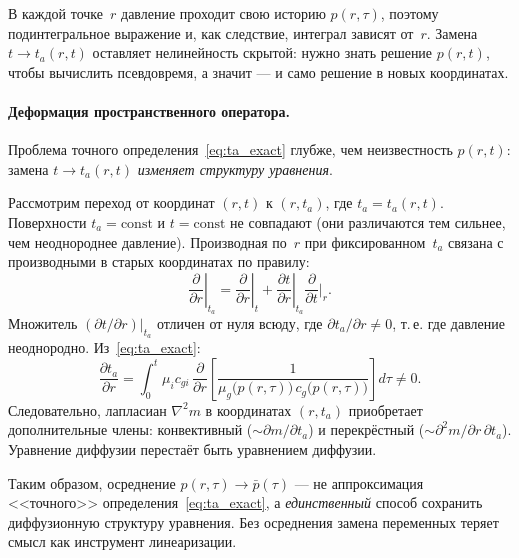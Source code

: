 ﻿\documentclass[12pt,a4paper]{article}
\begin{document}
В каждой точке~$r$ давление проходит свою историю $p(r,\tau)$,
поэтому подинтегральное выражение и, как следствие, интеграл
зависят от~$r$. Замена $t \to t_a(r,t)$ оставляет нелинейность
скрытой: нужно знать решение $p(r,t)$, чтобы вычислить
псевдовремя, а значит --- и само решение в новых координатах.

\paragraph{Деформация пространственного оператора.}
Проблема точного определения~\eqref{eq:ta_exact} глубже, чем
неизвестность $p(r,t)$: замена $t \to t_a(r,t)$ \emph{изменяет
структуру уравнения}.

Рассмотрим переход от координат $(r,t)$ к $(r,t_a)$, где
$t_a = t_a(r,t)$. Поверхности $t_a = \mathrm{const}$ и
$t = \mathrm{const}$ не совпадают (они различаются тем
сильнее, чем неоднороднее давление). Производная по~$r$
при фиксированном~$t_a$ связана с производными в старых
координатах по правилу:
\begin{equation}\label{eq:dr_ta}
  \left.\frac{\partial}{\partial r}\right|_{t_a}
  = \left.\frac{\partial}{\partial r}\right|_{t}
  + \left.\frac{\partial t}{\partial r}\right|_{t_a}
    \frac{\partial}{\partial t}\bigg|_{r}.
\end{equation}
Множитель $(\partial t/\partial r)|_{t_a}$ отличен от нуля
всюду, где $\partial t_a/\partial r \neq 0$, т.\,е. где
давление неоднородно. Из~\eqref{eq:ta_exact}:
\begin{equation}\label{eq:dta_dr}
  \frac{\partial t_a}{\partial r}
  = \int_0^t \mu_i c_{gi}\,
    \frac{\partial}{\partial r}
    \!\left[\frac{1}{\mu_g\bigl(p(r,\tau)\bigr)\,
    c_g\bigl(p(r,\tau)\bigr)}\right] d\tau
  \neq 0.
\end{equation}
Следовательно, лапласиан $\nabla^2 m$ в координатах $(r,t_a)$
приобретает дополнительные члены: конвективный
($\sim \partial m / \partial t_a$) и перекрёстный
($\sim \partial^2 m / \partial r\,\partial t_a$).
Уравнение диффузии перестаёт быть уравнением диффузии.

Таким образом, осреднение $p(r,\tau) \to \bar{p}(\tau)$ ---
не аппроксимация <<точного>> определения~\eqref{eq:ta_exact},
а \emph{единственный} способ сохранить диффузионную структуру
уравнения. Без осреднения замена переменных теряет смысл
как инструмент линеаризации.
\end{document}
